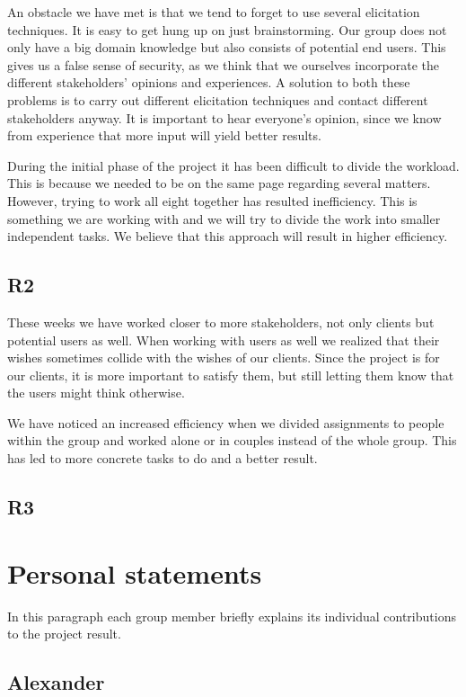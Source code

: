 \documentclass[a4paper]{article}
\begin{document}
An obstacle we have met is that we tend to forget to use several elicitation techniques. It is easy to get hung up on just brainstorming. Our group does not only have a big domain knowledge but also consists of potential end users. This gives us a false sense of security, as we think that we ourselves incorporate the different stakeholders' opinions and experiences. A solution to both these problems is to carry out different elicitation techniques and contact different stakeholders anyway. It is important to hear everyone's opinion, since we know from experience that more input will yield better results.

During the initial phase of the project it has been difficult to divide the workload. This is because we needed to be on the same page regarding several matters. However, trying to work all eight together has resulted inefficiency. This is something we are working with and we will try to divide the work into smaller independent tasks. We believe that this approach will result in higher efficiency.
\subsection{R2}
These weeks we have worked closer to more stakeholders, not only clients but potential users as well. When working with users as well we realized that their wishes sometimes collide with the wishes of our clients. Since the project is for our clients, it is more important to satisfy them, but still letting them know that the users might think otherwise.

We have noticed an increased efficiency when we divided assignments to people within the group and worked alone or in couples instead of the whole group. This has led to more concrete tasks to do and a better result.

\subsection{R3}

	\section{Personal statements}
In this paragraph each group member briefly explains its individual contributions to the project result.
	
	\subsection{Alexander}
\end{document}

